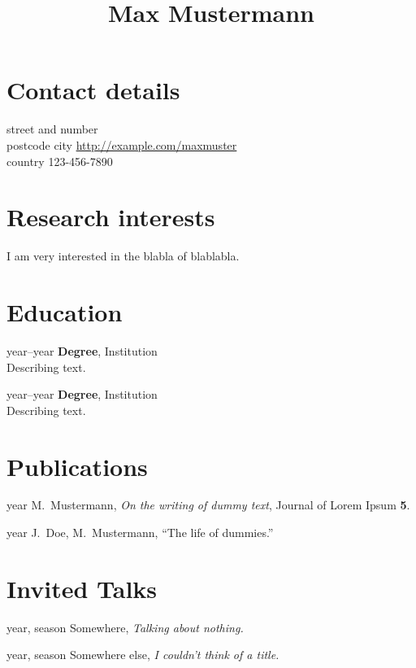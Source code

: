 \documentclass{CV}
\title{Max Mustermann}
\begin{document}
 
\maketitle

\section{Contact details}

street and number \hfill {}\\
postcode city     \hfill \url{http://example.com/maxmuster}\\
country           \hfill 123-456-7890\\

\section{Research interests}

I am very interested in the blabla of blablabla.

\section{Education}

\begin{CV}
\item[year--year] \textbf{Degree}, Institution\\
    Describing text.
\item[year--year] \textbf{Degree}, Institution\\
    Describing text.
\end{CV}

\section{Publications}
\begin{CV}
\item[year] M.~Mustermann, \emph{On the writing of dummy text}, Journal of Lorem Ipsum \textbf{5}.
\item[year] J.~Doe, M.~Mustermann, \enquote{The life of dummies.}
\end{CV}

\section{Invited Talks}

\begin{CV}
\item[year, season] Somewhere, \emph{Talking about nothing.}
\item[year, season] Somewhere else, \emph{I couldn't think of a title.}
\end{CV}
\end{document}

